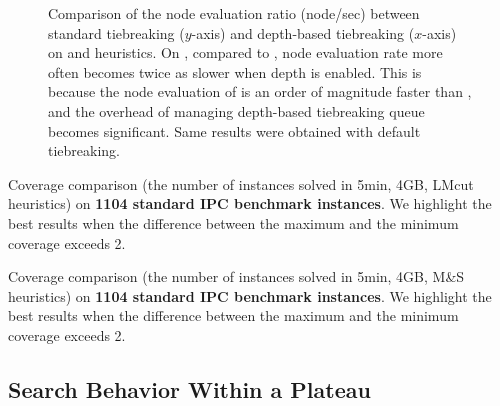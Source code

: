 \begin{figure}[htbp]
 \caption{Comparison of the node evaluation ratio (node/sec) between standard tiebreaking ($y$-axis) and
 depth-based tiebreaking ($x$-axis) on \lmcut and \mands heuristics. On \mands, compared to \lmcut, node evaluation rate more often becomes
 twice as slower when depth is enabled. This is because the node evaluation of \mands is an order of
 magnitude faster than \lmcut, and the overhead of managing depth-based tiebreaking queue becomes significant. Same results were obtained with \lifo default tiebreaking. }
 \label{fig:expansion-ratio}
\end{figure}

\begin{table}[htbp]
 {
 \centering
 
  \caption{
 Coverage comparison (the number of instances solved in 5min, 4GB, LMcut
 heuristics) on \textbf{1104 standard IPC benchmark instances}. We highlight the
 best results when the difference between the maximum and the minimum coverage exceeds 2.
 }
 \label{tbl:lmcut-ipc-full}
 }
\end{table}

\begin{table}[htbp]
 {
 \centering
 
  \caption{
 Coverage comparison (the number of instances solved in 5min, 4GB, M\&S
 heuristics) on \textbf{1104 standard IPC benchmark instances}. We highlight the
 best results when the difference between the maximum and the minimum coverage exceeds 2.
 }
 \label{tbl:mands-ipc-full}
 }
\end{table}



\clearpage

\subsection{Search Behavior Within a Plateau}

